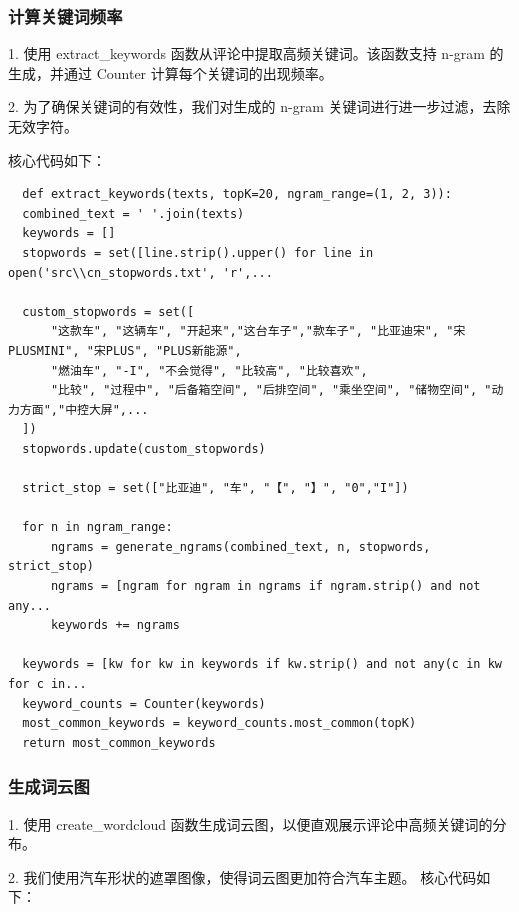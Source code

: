 \documentclass[UTF8,a4paper,15pt,titlepage,oneside]{ctexbook}
\begin{document}
\subsubsection{计算关键词频率}

1. 使用 extract\_keywords 函数从评论中提取高频关键词。该函数支持 n-gram 的生成，并通过 Counter 计算每个关键词的出现频率。

2. 为了确保关键词的有效性，我们对生成的 n-gram 关键词进行进一步过滤，去除无效字符。

核心代码如下：

\begin{mdframed}[backgroundcolor=darkgray, linecolor=lightgray, linewidth=1pt, innermargin=0.5cm, outermargin=0.5cm, skipbelow=0.1cm]
  \color{white}
  \begin{verbatim}
  def extract_keywords(texts, topK=20, ngram_range=(1, 2, 3)):
  combined_text = ' '.join(texts)
  keywords = []
  stopwords = set([line.strip().upper() for line in open('src\\cn_stopwords.txt', 'r',...

  custom_stopwords = set([
      "这款车", "这辆车", "开起来","这台车子","款车子", "比亚迪宋", "宋PLUSMINI", "宋PLUS", "PLUS新能源",
      "燃油车", "-I", "不会觉得", "比较高", "比较喜欢",
      "比较", "过程中", "后备箱空间", "后排空间", "乘坐空间", "储物空间", "动力方面","中控大屏",...
  ])
  stopwords.update(custom_stopwords)

  strict_stop = set(["比亚迪", "车", "【", "】", "0","I"])

  for n in ngram_range:
      ngrams = generate_ngrams(combined_text, n, stopwords, strict_stop)
      ngrams = [ngram for ngram in ngrams if ngram.strip() and not any...
      keywords += ngrams

  keywords = [kw for kw in keywords if kw.strip() and not any(c in kw for c in...
  keyword_counts = Counter(keywords)
  most_common_keywords = keyword_counts.most_common(topK)
  return most_common_keywords
\end{verbatim}  
\end{mdframed}

\subsubsection{生成词云图}

1. 使用 create\_wordcloud 函数生成词云图，以便直观展示评论中高频关键词的分布。

2. 我们使用汽车形状的遮罩图像，使得词云图更加符合汽车主题。
核心代码如下：
\end{document}
